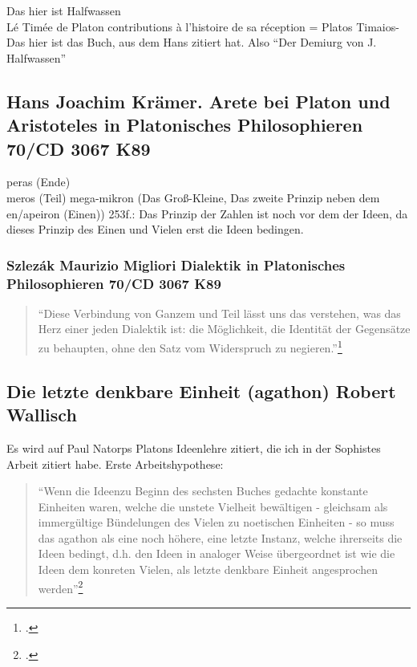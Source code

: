 \documentclass[12pt]{article}
\newcommand*{\zitatblock}[1]{%
    \begin{quote}
    \fontsize{10}{12}\selectfont
    \setlength{\parskip}{1.0em}
    #1
    \end{quote}
}
\begin{document}
Das hier ist Halfwassen\\
Lé Timée de Platon contributions à l'histoire de sa réception = Platos Timaios- Das hier ist das Buch, aus dem Hans zitiert hat. Also \enquote{Der Demiurg von J. Halfwassen}
\subsection*{Hans Joachim Krämer. Arete bei Platon und Aristoteles in Platonisches Philosophieren 70/CD 3067 K89}
peras (Ende)\\
meros (Teil)
mega-mikron (Das Groß-Kleine, Das zweite Prinzip neben dem en/apeiron (Einen))
253f.: Das Prinzip der Zahlen ist noch vor dem der Ideen, da dieses Prinzip des Einen und Vielen erst die Ideen bedingen. 

\subsubsection*{Szlezák Maurizio Migliori Dialektik in Platonisches Philosophieren 70/CD 3067 K89}
\zitatblock{\enquote{Diese Verbindung von Ganzem und Teil lässt uns das verstehen, was das Herz einer jeden Dialektik ist: die Möglichkeit, die Identität der Gegensätze zu behaupten, ohne den Satz vom Widerspruch zu negieren.}\footcite[][S. 150]{Migliori}}

\subsection*{Die letzte denkbare Einheit (agathon) Robert Wallisch}
Es wird auf Paul Natorps Platons Ideenlehre zitiert, die ich in der Sophistes Arbeit zitiert habe. 
Erste Arbeitshypothese: \zitatblock{\enquote{Wenn die Ideenzu Beginn des sechsten Buches gedachte konstante Einheiten waren, welche die unstete Vielheit bewältigen - gleichsam als immergültige Bündelungen des Vielen zu noetischen Einheiten - so muss das agathon als eine noch höhere, eine letzte Instanz, welche ihrerseits die Ideen bedingt, d.h. den Ideen in analoger Weise übergeordnet ist wie die Ideen dem konreten Vielen, als letzte denkbare Einheit angesprochen werden}\footcite[][S. 10]{Wallisch}}
\end{document}
